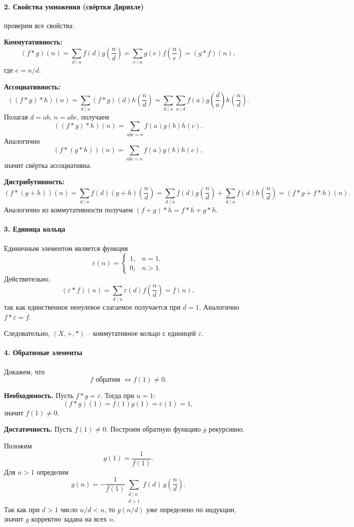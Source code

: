 \documentclass[12pt,a4paper]{article}
\begin{document}
\paragraph{2. Свойства умножения (свёртки Дирихле)} проверим все свойства:

\textbf{Коммутативность:}
\[
(f*g)(n)=\sum_{d\mid n} f(d)g\!\left(\frac nd\right)
=\sum_{e\mid n} g(e)f\!\left(\frac ne\right)=(g*f)(n),
\]
где $e=n/d$.

\textbf{Ассоциативность:}
\[
((f*g)*h)(n)
=\sum_{d\mid n}(f*g)(d)h\!\left(\frac nd\right)
=\sum_{d\mid n}\sum_{a\mid d} f(a)g\!\left(\frac da\right)h\!\left(\frac nd\right).
\]
Полагая $d=ab$, $n=abc$, получаем
\[
((f*g)*h)(n)=\sum_{abc=n} f(a)g(b)h(c).
\]
Аналогично
\[
(f*(g*h))(n)=\sum_{abc=n} f(a)g(b)h(c),
\]
значит свёртка ассоциативна.

\textbf{Дистрибутивность:}
\[
(f*(g+h))(n)
=\sum_{d\mid n} f(d)(g+h)\!\left(\frac nd\right)
=\sum_{d\mid n} f(d)g\!\left(\frac nd\right)
+\sum_{d\mid n} f(d)h\!\left(\frac nd\right)
=(f*g+f*h)(n).
\]
Аналогично из коммутативности получаем $(f+g)*h=f*h+g*h$.

\paragraph{3. Единица кольца}

Единичным элементом является функция
\[
\varepsilon(n)=
\begin{cases}
1,& n=1,\\
0,& n>1.
\end{cases}
\]
Действительно,
\[
(\varepsilon*f)(n)=\sum_{d\mid n}\varepsilon(d)f\!\left(\frac nd\right)=f(n),
\]
так как единственное ненулевое слагаемое получается при $d=1$. Аналогично $f*\varepsilon=f$.

Следовательно, $(X,+,*)$ -- коммутативное кольцо с единицей $\varepsilon$.

\paragraph{4. Обратимые элементы}

Докажем, что
\[
f \text{ обратим } \iff f(1)\ne 0.
\]

\textbf{Необходимость.}
Пусть $f*g=\varepsilon$. Тогда при $n=1$:
\[
(f*g)(1)=f(1)g(1)=\varepsilon(1)=1,
\]
значит $f(1)\ne 0$.

\textbf{Достаточность.}
Пусть $f(1)\ne 0$. Построим обратную функцию $g$ рекурсивно.

Положим
\[
g(1)=\frac1{f(1)}.
\]
Для $n>1$ определим
\[
g(n)=-\frac1{f(1)}
\sum_{\substack{d\mid n\\ d>1}} f(d)\,g\!\left(\frac nd\right).
\]
Так как при $d>1$ число $n/d<n$, то $g(n/d)$ уже определено по индукции, значит $g$ корректно задана на всех $n$.
\end{document}
